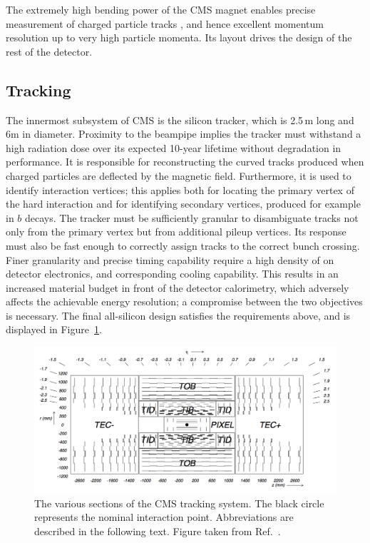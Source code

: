 The extremely high bending power of the CMS magnet enables precise measurement of charged particle tracks , 
and hence excellent momentum resolution up to very high particle momenta.
Its layout drives the design of the rest of the detector.

\subsection{Tracking}

The innermost subsystem of CMS is the silicon tracker, which is 2.5\,m long and 6m in diameter. 
Proximity to the beampipe implies the tracker must withstand a high radiation dose over its expected 10-year lifetime without degradation in performance.
It is responsible for reconstructing the curved tracks produced when charged particles are deflected by the magnetic field. %
Furthermore, it is used to identify interaction vertices; 
this applies both for locating the primary vertex of the hard interaction and for identifying secondary vertices, produced for example in $b$ decays.
The tracker must be sufficiently granular to disambiguate tracks not only from the primary vertex but from additional pileup vertices.
Its response must also be fast enough to correctly assign tracks to the correct bunch crossing.
Finer granularity and precise timing capability require a high density of on detector electronics, and corresponding cooling capability.
This results in an increased material budget in front of the detector calorimetry, which adversely affects the achievable energy resolution; 
a compromise between the two objectives is necessary.
The final all-silicon design satisfies the requirements above, and is displayed in Figure~\ref{fig:detector_tracker}.

\begin{figure}[h!]
  \centering
  \includegraphics[width=\textwidth]{Figures/Detector/TrackerUgly.png}
  \caption[The CMS tracker.]
  {The various sections of the CMS tracking system.
  The black circle represents the nominal interaction point.
  Abbreviations are described in the following text.
  Figure taken from Ref.~\cite{CMSdetector}.}
  \label{fig:detector_tracker}
\end{figure}

